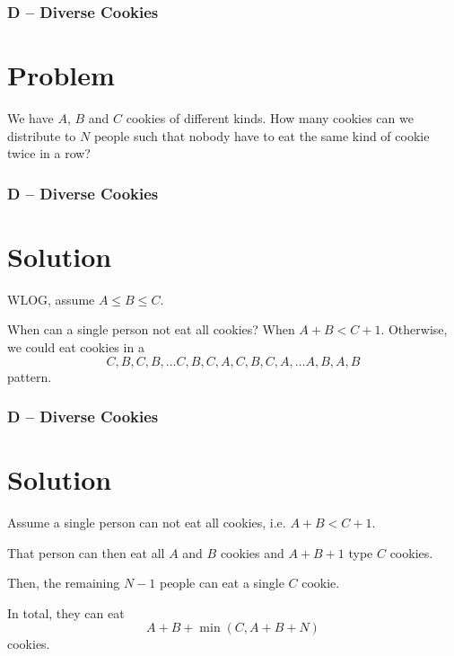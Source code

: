 \begin{frame}
  \frametitle{D -- Diverse Cookies}
  \section*{Problem}
  We have $A$, $B$ and $C$ cookies of different kinds.
  How many cookies can we distribute to $N$ people such that nobody have to eat the same kind of cookie twice in a row?
\end{frame}
\begin{frame}
  \frametitle{D -- Diverse Cookies}
  \section*{Solution}
  WLOG, assume $A \le B \le C$.

  When can a single person not eat all cookies? When $A + B < C + 1$. 
  Otherwise, we could eat cookies in a $$C, B, C, B, \dots C, B, C, A, C, B, C, A, \dots A, B, A, B$$ pattern.
\end{frame}
\begin{frame}
  \frametitle{D -- Diverse Cookies}
  \section*{Solution}
  Assume a single person can not eat all cookies, i.e. $A + B < C + 1$.
  
  That person can then eat all $A$ and $B$ cookies and $A + B + 1$ type $C$ cookies.

  Then, the remaining $N - 1$ people can eat a single $C$ cookie.

  In total, they can eat
  $$A + B + \min(C, A + B + N)$$
  cookies.
\end{frame}
